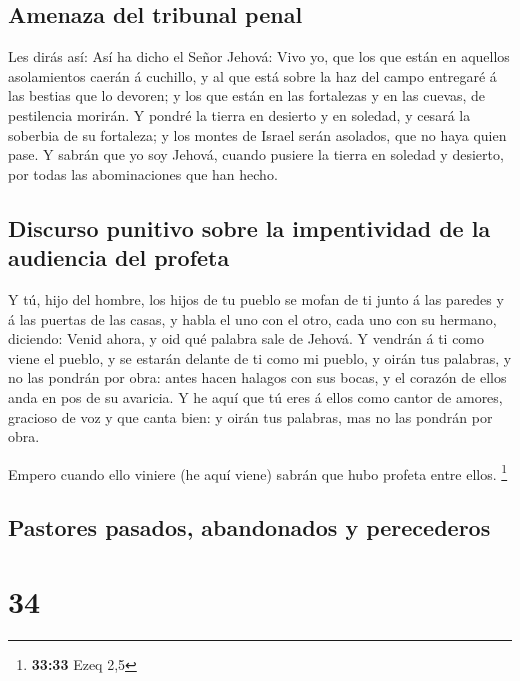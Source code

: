 \hypertarget{amenaza-del-tribunal-penal}{%
\subsection{Amenaza del tribunal
penal}\label{amenaza-del-tribunal-penal}}

 Les dirás así: Así ha dicho el Señor Jehová: Vivo yo,
que los que están en aquellos asolamientos caerán á cuchillo, y al que
está sobre la haz del campo entregaré á las bestias que lo devoren; y
los que están en las fortalezas y en las cuevas, de pestilencia morirán.
 Y pondré la tierra en desierto y en soledad, y cesará la
soberbia de su fortaleza; y los montes de Israel serán asolados, que no
haya quien pase.  Y sabrán que yo soy Jehová, cuando
pusiere la tierra en soledad y desierto, por todas las abominaciones que
han hecho.

\hypertarget{discurso-punitivo-sobre-la-impentividad-de-la-audiencia-del-profeta}{%
\subsection{Discurso punitivo sobre la impentividad de la audiencia del
profeta}\label{discurso-punitivo-sobre-la-impentividad-de-la-audiencia-del-profeta}}

 Y tú, hijo del hombre, los hijos de tu pueblo se mofan
de ti junto á las paredes y á las puertas de las casas, y habla el uno
con el otro, cada uno con su hermano, diciendo: Venid ahora, y oid qué
palabra sale de Jehová.  Y vendrán á ti como viene el
pueblo, y se estarán delante de ti como mi pueblo, y oirán tus palabras,
y no las pondrán por obra: antes hacen halagos con sus bocas, y el
corazón de ellos anda en pos de su avaricia.  Y he aquí
que tú eres á ellos como cantor de amores, gracioso de voz y que canta
bien: y oirán tus palabras, mas no las pondrán por obra.

 Empero cuando ello viniere (he aquí viene) sabrán que
hubo profeta entre ellos. \footnote{\textbf{33:33} Ezeq 2,5}

\hypertarget{pastores-pasados-abandonados-y-perecederos}{%
\subsection{Pastores pasados, abandonados y
perecederos}\label{pastores-pasados-abandonados-y-perecederos}}

\hypertarget{section-33}{%
\section{34}\label{section-33}}

